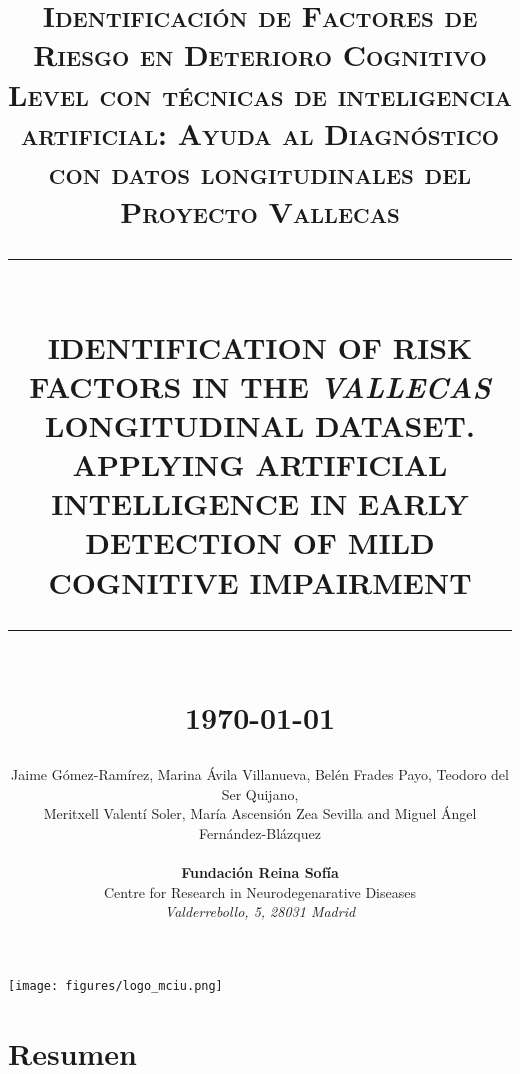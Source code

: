 \documentclass[11pt]{article}
\theoremstyle{definition}
\theoremstyle{remark}
\newcommand{\HRule}[1]{\rule{\linewidth}{#1}}
\begin{document}

\title{ \normalsize \textsc{Identificación de Factores de Riesgo en Deterioro Cognitivo Level con técnicas de inteligencia artificial: Ayuda al Diagnóstico con datos longitudinales del Proyecto Vallecas}
		\\ [2.0cm]
		\HRule{0.5pt} \\
		\LARGE \textbf{\uppercase{Identification of risk factors in the \emph{Vallecas} longitudinal dataset. Applying Artificial Intelligence in early detection of Mild Cognitive Impairment}}
		\HRule{2pt} \\ [0.5cm]
		\normalsize \today \vspace*{5\baselineskip}}

\date{ }
\author{
		Jaime G\'omez-Ram\'irez, Marina \'Avila Villanueva, Bel\'en Frades Payo, Teodoro del Ser Quijano,\\ Meritxell Valent\'i Soler, María Ascensi\'on Zea Sevilla and Miguel \'Angel Fern\'andez-Bl\'azquez   \\  \\
		\textbf{\large{Fundaci\'on Reina Sof\'ia}} \\
		Centre for Research in Neurodegenarative Diseases
		\\ \emph{Valderrebollo, 5, 28031 Madrid}
 }

\maketitle
\begin{center}
\texttt{[image: figures/logo\_mciu.png]}
\end{center}
\newpage
\tableofcontents
\newpage

\sectionfont{\scshape}



\section*{Resumen}
\end{document}
